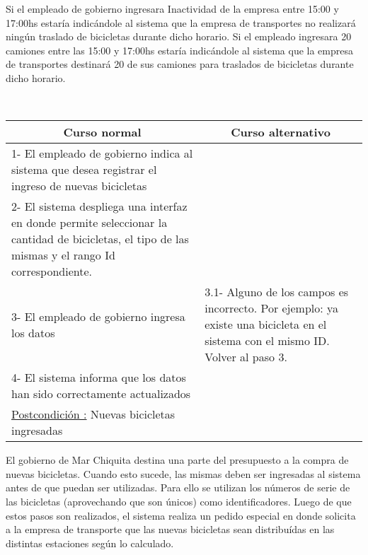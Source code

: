 Si el empleado de gobierno ingresara Inactividad de la empresa entre 15:00 y 17:00hs estaría indicándole al sistema que la empresa de transportes no realizará ningún
traslado de bicicletas durante dicho horario.
Si el empleado ingresara 20 camiones entre las 15:00 y 17:00hs estaría indicándole al sistema que la empresa de transportes destinará 20 de sus camiones para traslados
de bicicletas durante dicho horario.

~


\begin{center}
    \centering
    \begin{tabular}{ | p{11cm} | p{6cm} | }
    	\multicolumn{1}{c}{\cellcolor{black!30}\textbf{Curso normal}} & 
    	\multicolumn{1}{c}{\cellcolor{black!30}\textbf{Curso alternativo}} \\ \hline
    	1- El empleado de gobierno indica al sistema que desea registrar el ingreso de nuevas bicicletas & \\ \hline
    	2- El sistema despliega una interfaz en donde permite seleccionar la cantidad de bicicletas, el tipo de las mismas y el rango Id correspondiente.& \\ \hline
    	3- El empleado de gobierno ingresa los datos & 3.1-  Alguno de los campos es incorrecto. Por ejemplo:
        ya existe una bicicleta en el sistema con el mismo ID. Volver al paso 3. \\ \hline
    	4- El sistema informa que los datos han sido correctamente actualizados & \\ \hline
    	\underline{Postcondición :} Nuevas bicicletas ingresadas & \\ \hline
    \end{tabular}
\end{center}

El gobierno de Mar Chiquita destina una parte del presupuesto a la compra de nuevas bicicletas. Cuando esto sucede, las mismas
deben ser ingresadas al sistema antes de que puedan ser utilizadas. Para ello se utilizan los números de serie de las bicicletas (aprovechando que son únicos) como identificadores. Luego de que estos pasos son realizados, el sistema
realiza un pedido especial en donde solicita a la empresa de transporte que las nuevas bicicletas sean distribuídas
en las distintas estaciones según lo calculado.

~


